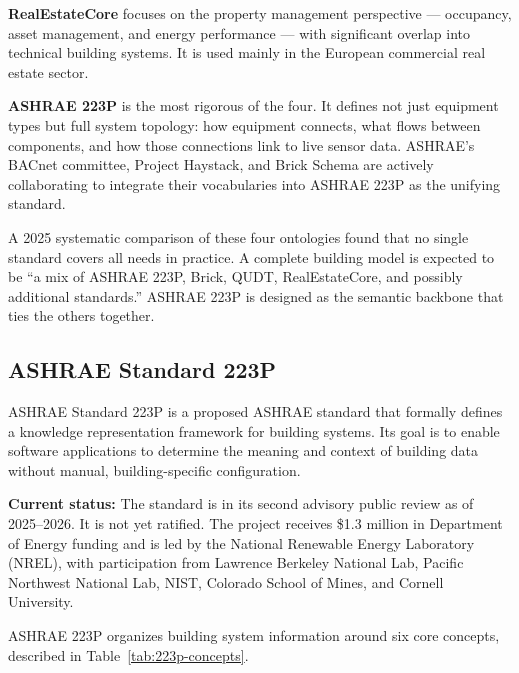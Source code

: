 \textbf{RealEstateCore} focuses on the property management perspective --- occupancy, asset management,
and energy performance --- with significant overlap into technical building systems.
It is used mainly in the European commercial real estate sector.

\textbf{ASHRAE 223P} is the most rigorous of the four.
It defines not just equipment types but full system topology: how equipment connects, what flows between
components, and how those connections link to live sensor data.
ASHRAE's BACnet committee, Project Haystack, and Brick Schema are actively collaborating to integrate
their vocabularies into ASHRAE 223P as the unifying standard.

A 2025 systematic comparison of these four ontologies found that no single standard covers all needs
in practice.
A complete building model is expected to be ``a mix of ASHRAE 223P, Brick, QUDT, RealEstateCore, and
possibly additional standards.''
ASHRAE 223P is designed as the semantic backbone that ties the others together.

\subsection{ASHRAE Standard 223P}
\label{subsec:ashrae-223p}

ASHRAE Standard 223P is a proposed ASHRAE standard that formally defines a knowledge representation
framework for building systems.
Its goal is to enable software applications to determine the meaning and context of building data
without manual, building-specific configuration.

\textbf{Current status:} The standard is in its second advisory public review as of 2025--2026.
It is not yet ratified.
The project receives \$1.3 million in Department of Energy funding and is led by the National Renewable
Energy Laboratory (NREL), with participation from Lawrence Berkeley National Lab, Pacific Northwest
National Lab, NIST, Colorado School of Mines, and Cornell University.

ASHRAE 223P organizes building system information around six core concepts, described in
Table~\ref{tab:223p-concepts}.

